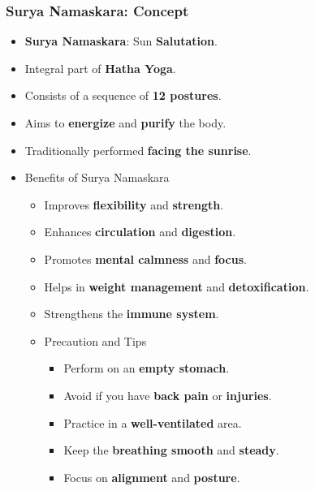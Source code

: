 \begin{frame}[fragile]\frametitle{Surya Namaskara: Concept}
      \begin{itemize}
        \item \textbf{Surya Namaskara}: Sun \textbf{Salutation}.
        \item Integral part of \textbf{Hatha Yoga}.
        \item Consists of a sequence of \textbf{12 postures}.
        \item Aims to \textbf{energize} and \textbf{purify} the body.
        \item Traditionally performed \textbf{facing the sunrise}.
		\item Benefits of Surya Namaskara
		      \begin{itemize}
			\item Improves \textbf{flexibility} and \textbf{strength}.
			\item Enhances \textbf{circulation} and \textbf{digestion}.
			\item Promotes \textbf{mental calmness} and \textbf{focus}.
			\item Helps in \textbf{weight management} and \textbf{detoxification}.
			\item Strengthens the \textbf{immune system}.
		\item Precaution and Tips
		  \begin{itemize}
			\item Perform on an \textbf{empty stomach}.
			\item Avoid if you have \textbf{back pain} or \textbf{injuries}.
			\item Practice in a \textbf{well-ventilated} area.
			\item Keep the \textbf{breathing smooth} and \textbf{steady}.
			\item Focus on \textbf{alignment} and \textbf{posture}.
		  \end{itemize}		
		  \end{itemize}
      \end{itemize}

\end{frame}

